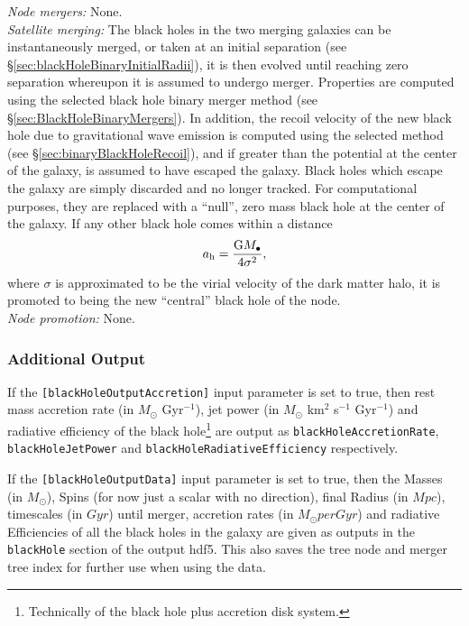 \noindent\emph{Node mergers:} None.\\

\noindent\emph{Satellite merging:} The black holes in the two merging galaxies can be instantaneously merged, or taken at an initial separation (see \S\ref{sec:blackHoleBinaryInitialRadii}), it is then evolved until reaching zero separation whereupon it is assumed to undergo merger. Properties are computed using the selected black hole binary merger method (see \S\ref{sec:BlackHoleBinaryMergers}). In addition, the recoil velocity of the new black hole due to gravitational wave emission is computed using the selected method (see \S\ref{sec:binaryBlackHoleRecoil}), and if greater than the potential at the center of the galaxy, is assumed to have escaped the galaxy. Black holes which escape the galaxy are simply discarded and no longer tracked. For computational purposes, they are replaced with a ``null'', zero mass black hole at the center of the galaxy. If any other black hole comes within a distance 
\begin{equation}
a_{\rm h} = {{\rm G} M_\bullet \over 4 \sigma^2},
\end{equation}
where $\sigma$ is approximated to be the virial velocity of the dark matter halo, it is promoted to being the new ``central'' black hole of the node.\\

\noindent\emph{Node promotion:} None.\\

\subsubsection{Additional Output}

If the {\tt [blackHoleOutputAccretion]} input parameter is set to true, then rest mass accretion rate (in $M_\odot$ Gyr$^{-1}$), jet power (in $M_\odot$ km$^2$ s$^{-1}$ Gyr$^{-1}$) and radiative efficiency of the black hole\footnote{Technically of the black hole plus accretion disk system.} are output as {\tt blackHoleAccretionRate}, {\tt blackHoleJetPower} and {\tt blackHoleRadiativeEfficiency} respectively.

If the {\tt [blackHoleOutputData]} input parameter is set to true, then the Masses (in $M_\odot$), Spins (for now just a scalar with no direction), final Radius (in $Mpc$), timescales (in $Gyr$) until merger, accretion rates (in $M_\odot per Gyr$) and radiative Efficiencies of all the black holes in the galaxy are given as outputs in the {\tt blackHole} section of the output hdf5. This also saves the tree \gls{node} and merger tree index for further use when using the data.

